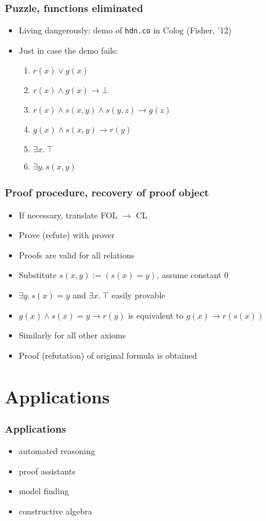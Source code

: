 \documentclass[handout,11pt]{beamer}
\newcommand{\imp}{\rightarrow}
\begin{document}
\begin{frame}
\frametitle{Puzzle, functions eliminated}
 \begin{itemize}[<+->]
    \item Living dangerously: demo of {\tt hdn.co} in Colog (Fisher, '12)
    \item Just in case the demo fails:
    \begin{enumerate}
      \item $r(x) \vee g(x)$ 
      \item $r(x) \wedge g(x) \imp \bot$
      \item $r(x) \wedge s(x,y) \wedge s(y,z) \imp g(z)$ 
      \item $g(x) \wedge s(x,y) \imp r(y)$    
      \item $\exists x.~\top$
      \item $\exists y.\,s(x,y)$
  \end{enumerate}
   \end{itemize}
\end{frame}

\begin{frame}
\frametitle{Proof procedure, recovery of proof object}
 \begin{itemize}[<+->]
    \item If necessary, translate FOL $\rightarrow$ CL
    \item Prove (refute) with prover
    \item Proofs are valid for all relations %
    \item Substitute $s(x,y) := (s(x) = y)$, assume constant $0$
    \item $\exists y.\,s(x)=y$ and $\exists x.~\top$ easily provable
    \item $g(x) \wedge s(x)=y \imp r(y)$ is equivalent to $g(x) \imp r(s(x))$
    \item Similarly for all other axioms
    \item Proof (refutation) of original formula is obtained
 \end{itemize}
\end{frame}


\section{Applications}

\begin{frame}
\frametitle{Applications}
 \begin{itemize}[<+->]   %
    \item automated reasoning
    \item proof assistants    
    \item model finding
    \item constructive algebra
 \end{itemize}
\end{frame}
\end{document}

